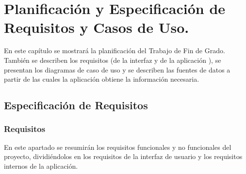 \chapter{Planificación y Especificación de Requisitos y Casos de Uso.}
En este capítulo se mostrará la planificación del Trabajo de Fin de Grado. También se describen los requisitos (de la interfaz y de la aplicación ), se presentan los diagramas de caso de uso y se describen	las fuentes de datos a partir de las cuales la aplicación obtiene la información necesaria.


\section{Especificación de  Requisitos}
\subsection[Requisitos]{Requisitos}
En este apartado se resumirán los requisitos funcionales y no funcionales del proyecto, dividiéndolos en los requisitos de la interfaz de usuario y los requisitos internos de la aplicación.
